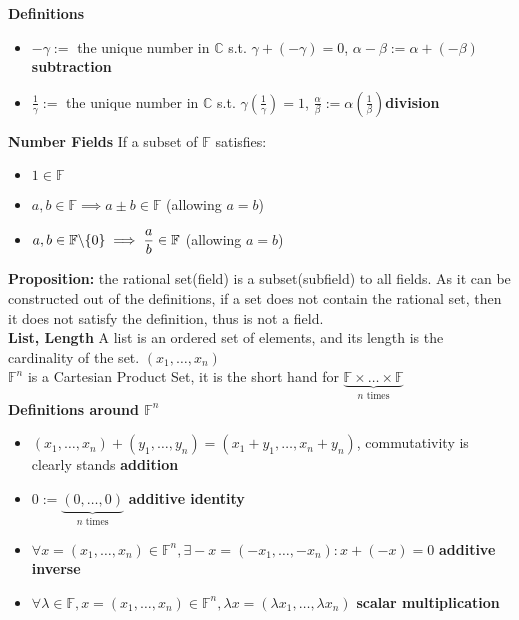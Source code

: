 \documentclass{article}
\newcommand{\0}{{\bf{0}}}
\begin{document}
$$$$
{\textbf{Definitions}}
\begin{itemize}
    \item $-\gamma:=$ the unique number in $\mathbb{C}$ s.t. $\gamma+(-\gamma)=0$, $\alpha-\beta:=\alpha+(-\beta)$\null\hfill{\textbf{subtraction}}
    \item $\frac{1}{\gamma}:=$ the unique number in $\mathbb{C}$ s.t. $\gamma(\frac{1}{\gamma})=1$, $\frac{\alpha}{\beta}:=\alpha(\frac{1}{\beta})$\null\hfill{\textbf{division}}
\end{itemize}
$$$$
{\textbf{Number Fields}}
If a subset of $\mathbb{F}$ satisfies:
\begin{itemize}
    \item $1\in\mathbb{F}$
    \item $a,b\in\mathbb{F}\implies{}a\pm{}b\in\mathbb{F}$ (allowing $a=b$)
    \item $a,b\in\mathbb{F}\symbol{92}\{0\}\implies\dfrac{a}{b}\in\mathbb{F}$ (allowing $a=b$)
\end{itemize}
{\textbf{Proposition:}} the rational set(field) is a subset(subfield) to all fields. As it can be constructed out of the definitions, if a set does not contain the rational set, then it does not satisfy the definition, thus is not a field.
$$$$
{\textbf{List, Length}}
A list is an ordered set of elements, and its length is the cardinality of the set. $(x_1,\dots,x_n)$
$$$$
$\mathbb{F}^n$ is a Cartesian Product Set, it is the short hand for $\underbrace{\mathbb{F}\times{}\dots\times\mathbb{F}}_{n\mbox{ times}}$\\
{\textbf{Definitions around $\mathbb{F}^n$}}
\begin{itemize}
    \item $(x_1,\dots,x_n)+(y_1,\dots,y_n)=(x_1+y_1,\dots,x_n+y_n)$, commutativity is clearly stands \null\hfill{\textbf{ addition}}
    \item $0:=\underbrace{(0,\dots,0)}_{n\mbox{ times}}$ \null\hfill{\textbf{additive identity}}
    \item $\forall{}x=(x_1,\dots,x_n)\in\mathbb{F}^n,\exists{}-x=(-x_1,\dots,-x_n):x+(-x)=0$ \null\hfill{\textbf{additive inverse}}
    \item $\forall{}\lambda\in\mathbb{F},x=(x_1,\dots,x_n)\in\mathbb{F}^n,\lambda{}x=(\lambda{}x_1,\dots,\lambda{}x_n)$ \null\hfill{\textbf{scalar multiplication}}
\end{itemize}
\end{document}
